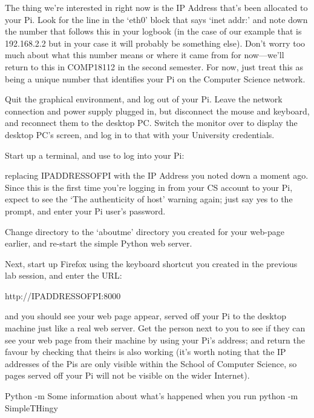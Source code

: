 The thing we're interested in right now is the IP Address that's been allocated to your Pi. Look for the line in the `eth0' block that says `inet addr:' and note down the number that follows this in your logbook (in the case of our example that is 192.168.2.2 but in your case it will probably be something else). Don't worry too much about what this number means or where it came from for now---we'll return to this in COMP18112 in the second semester. For now, just treat this as being a unique number that identifies your Pi on the Computer Science network. 

Quit the graphical environment, and log out of your Pi. Leave the network connection and power supply plugged in, but disconnect the mouse and keyboard, and reconnect them to the desktop PC. Switch the monitor over to display the desktop PC's screen, and log in to that with your University credentials. 

Start up a terminal, and use  to log into your Pi:


replacing IPADDRESSOFPI with the IP Address you noted down a moment ago. Since this is the first time you're logging in from your CS account to your Pi, expect to see the `The authenticity of host' warning again; just say yes to the prompt, and enter your Pi user's password. 

Change directory to the `aboutme' directory you created for your web-page earlier, and re-start the simple Python web server. 

Next, start up Firefox using the keyboard shortcut you created in the previous lab session, and enter the URL:

\begin{ttoutenv}
http://IPADDRESSOFPI:8000
\end{ttoutenv}

and you should see your web page appear, served off your Pi to the desktop machine just like a real web server. Get the person next to you to see if they can see your web page from their machine by using your Pi's address; and return the favour by checking that theirs is also working (it's worth noting that the IP addresses of the Pis are only visible within the School of Computer Science, so pages served off your Pi will not be visible on the wider Internet).

\begin{diversion}{Python -m}
\label{diversion:python-m}
Some information about what's happened when you run python -m SimpleTHingy
\end{diversion}

